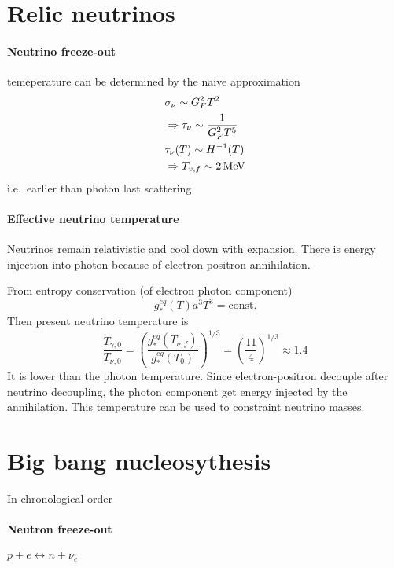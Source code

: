 \documentclass[12pt, a4paper, DIV=15]{article}
\numberwithin{equation}{section}
\begin{document}
\section{Relic neutrinos}
\paragraph{Neutrino freeze-out} temeperature can be determined by the naive approximation
\begin{align}
   &\sigma_\nu \sim G_F^2 T^2 \notag \\
   &\Rightarrow \tau_\nu \sim \frac{1}{G_F^2 T^5} \notag \\
   &\tau_\nu (T) \sim H^{-1}(T)  \notag\\
   &\Rightarrow T_{v,f} \sim \SI{2}{\mega\eV}
\end{align}
i.e.~earlier than photon last scattering.

\paragraph{Effective neutrino temperature}
Neutrinos remain relativistic and cool down with expansion. There is energy injection into photon because of electron positron annihilation.

From entropy conservation (of electron photon component)
\begin{equation}
   g_*^{eq}(T) a^3 T^3 = \text{const.}
\end{equation}
Then present neutrino temperature is
\begin{equation}
   \frac{T_{\gamma, 0}}{T_{\nu, 0}} = \left( \frac{g_*^{eq}(T_{\nu,f})}{g_*^{eq}(T_0)} \right)^{1/3} = \left( \frac{11}{4} \right)^{1/3} \approx 1.4
\end{equation}
It is lower than the photon temperature. Since electron-positron decouple after neutrino decoupling, the photon component get energy injected by the annihilation.
This temperature can be used to constraint neutrino masses.

\section{Big bang nucleosythesis}
In chronological order

\paragraph{Neutron freeze-out}
$p + e \leftrightarrow n + \nu_e$
\end{document}
